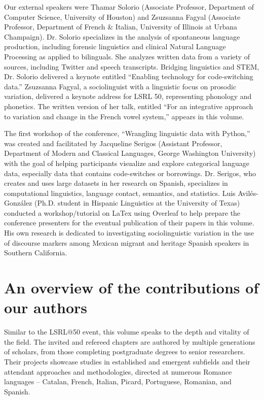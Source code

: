 \documentclass[output=paper,draftmode]{langscibook}
\begin{document}
Our external speakers were Thamar Solorio (Associate Professor, Department of Computer Science, University of Houston) and Zsuzsanna Fagyal (Associate Professor, Department of French \& Italian, University of Illinois at Urbana Champaign). Dr. Solorio specializes in the analysis of spontaneous language production, including forensic linguistics and clinical Natural Language Processing as applied to bilinguals. She analyzes written data from a variety of sources, including Twitter and speech transcripts. Bridging linguistics and STEM, Dr. Solorio delivered a keynote entitled “Enabling technology for code-switching data.” Zsuzsanna Fagyal, a sociolinguist with a linguistic focus on prosodic variation, delivered a keynote address for LSRL 50, representing phonology and phonetics.  The written version of her talk, entitled “For an integrative approach to variation and change in the French vowel system,” appears in this volume.

The first workshop of the conference, “Wrangling linguistic data with Python,” was created and facilitated by Jacqueline Serigos (Assistant Professor, Department of Modern and Classical Languages, George Washington University) with the goal of helping participants visualize and explore categorical language data, especially data that contains code-switches or borrowings. Dr. Serigos, who creates and uses large datasets in her research on Spanish, specializes in computational linguistics, language contact, semantics, and statistics. Luis Avilés-Gon\-zá\-lez (Ph.D. student in Hispanic Linguistics at the University of Texas) conducted a workshop/tutorial on LaTex using Overleaf to help prepare the conference presenters for the eventual publication of their papers in this volume. His own research is dedicated to investigating sociolinguistic variation in the use of discourse markers among Mexican migrant and heritage Spanish speakers in Southern California.
\section{An overview of the contributions of our authors}
Similar to the LSRL$@$50 event, this volume speaks to the depth and vitality of the field. The invited and refereed chapters are authored by multiple generations of scholars, from those completing postgraduate degrees to senior researchers. Their projects showcase studies in established and emergent subfields and their attendant approaches and methodologies, directed at numerous Romance languages -- Catalan, French, Italian, Picard, Portuguese, Romanian, and Spanish.
\end{document}

